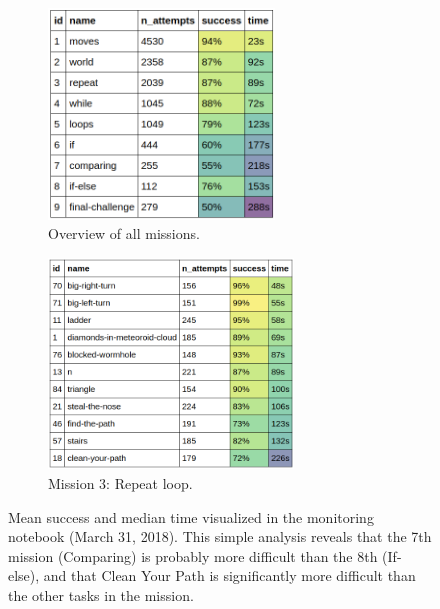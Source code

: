 \begin{figure}[htb]
\centering
\begin{subfigure}{.48\textwidth}
\centering
\includegraphics[height=56mm]{img/monitoring-notebook-levels}
\caption{Overview of all missions.}
\end{subfigure}
\begin{subfigure}{.51\textwidth}
\centering
\includegraphics[height=56mm]{img/monitoring-notebook-repeat}
\caption{Mission 3: Repeat loop.}
\end{subfigure}
\caption{%
  Mean success and median time visualized in the monitoring notebook
  (March 31, 2018). This simple analysis reveals
  that the 7th mission (Comparing) is probably more difficult than the 8th (If-else),
  and that Clean Your Path is significantly more difficult than
  the other tasks in the mission.}
\label{fig:monitoring-notebook}
\end{figure}




